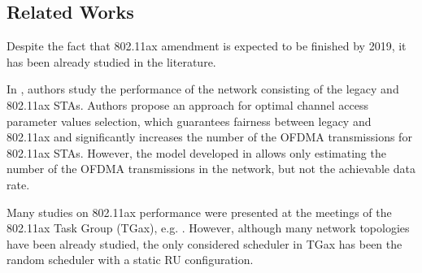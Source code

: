 %


\subsection{Related Works}

Despite the fact that 802.11ax amendment is expected to be finished by 2019, it has been already studied in the literature\cite{ bellalta2016ieee, khorov2016several, karaca2016resource, ofdma-par1, ofdma-par2}.

In \cite{khorov2016several}, authors study the performance of the network consisting of the legacy and 802.11ax STAs.
Authors propose an approach for optimal channel access parameter values selection, which guarantees fairness between legacy and 802.11ax and significantly increases the number of the OFDMA transmissions for 802.11ax STAs.
However, the model developed in \cite{khorov2016several} allows only estimating the number of the OFDMA transmissions in the network, but not the achievable data rate.

Many studies on 802.11ax performance were presented at the meetings of the 802.11ax Task Group (TGax), e.g. \cite{ofdma-par1, ofdma-par2}.
However, although many network topologies have been already studied, the only considered scheduler in TGax has been the random scheduler with a static RU configuration.

